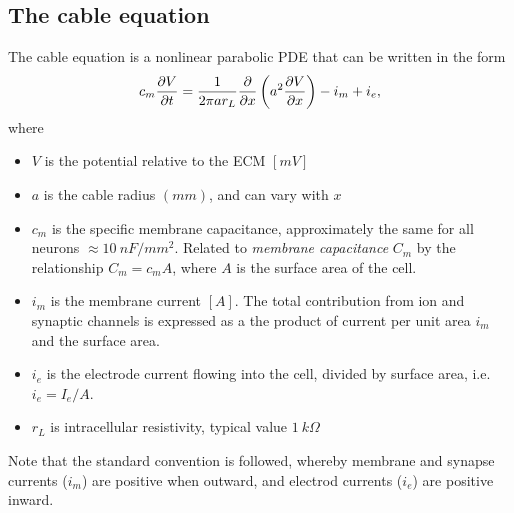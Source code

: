 \subsection{The cable equation}
The cable equation is a nonlinear parabolic PDE that can be written in the form
\begin{equation}
    \label{eq:cable}
    c_m \frac{\partial{V}}{\partial{t}} = \frac{1}{2\pi a r_{L}} \frac{\partial{}}{\partial{x}} \left( a^2 \frac{\partial{V}}{\partial{x}} \right) - i_m + i_e,
\end{equation}
where
\begin{itemize}
    \item $V$ is the potential relative to the ECM $[mV]$
    \item $a$ is the cable radius $(mm)$, and can vary with $x$
    \item $c_m$ is the {specific membrane capacitance}, approximately the same for all neurons $\approx 10~nF/mm^2$. Related to \emph{membrane capacitance} $C_m$ by the relationship $C_m=c_{m}A$, where $A$ is the surface area of the cell.
    \item $i_m$ is the membrane current $[A]$. The total contribution from ion and synaptic channels is expressed as a the product of current per unit area $i_m$ and the surface area.
    \item $i_e$ is the electrode current flowing into the cell, divided by surface area, i.e. $i_e=I_e/A$.
    \item $r_L$ is intracellular resistivity, typical value $1~k\Omega$
\end{itemize}

Note that the standard convention is followed, whereby membrane and synapse currents ($i_m$) are positive when outward, and electrod currents ($i_e$) are positive inward.

